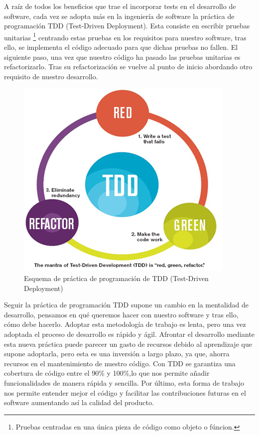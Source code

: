 A raíz de todos los beneficios que trae el incorporar tests en el desarrollo de software, cada vez se adopta más en la ingeniería de software la práctica de programación TDD (Test-Driven Deployment). Esta consiste en escribir pruebas unitarias \footnote{Pruebas centradas en una única pieza de código como objeto o fúncion.} centrando estas pruebas en los requisitos para nuestro software, tras ello, se implementa el código adecuado para que dichas pruebas no fallen. El siguiente paso, una vez que nuestro código ha pasado las pruebas unitarias es refactorizarlo. Tras su refactorización se vuelve al punto de inicio abordando otro requisito de nuestro desarrollo. \\
\begin{figure}[h]
    \centering
    \includegraphics[scale=0.8]{img/TDD__logo.jpg}
    \caption{Esquema de práctica de programación de TDD (Test-Driven Deployment)}
    \label{fig:tdd}
\end{figure}
Seguir la práctica de programación TDD supone un cambio en la mentalidad de desarrollo, pensamos en qué queremos hacer con nuestro software y tras ello, cómo debe hacerlo. Adoptar esta metodología de trabajo es lenta, pero una vez adoptada el proceso de desarrollo es rápido y ágil. Afrontar el desarrollo mediante esta nueva práctica puede parecer un gasto de recursos debido al aprendizaje que supone adoptarla, pero esta es una inversión a largo plazo, ya que, ahorra recursos en el mantenimiento de nuestro código. Con TDD se garantiza una cobertura de código entre el 90\% y 100\%,lo que nos permite añadir funcionalidades de manera rápida y sencilla. Por último, esta forma de trabajo nos permite entender mejor el código y facilitar las contribuciones futuras en el software aumentando así la calidad del producto. 
